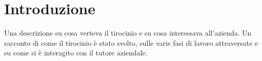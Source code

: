 \chapter{Introduzione}
	Una descrizione su cosa verteva il tirocinio e su cosa interessava 
	all'azienda. Un racconto di come il tirocinio è stato svolto, sulle varie 
	fasi di lavoro attraversate e su come si è interagito con il tutore 
	aziendale.